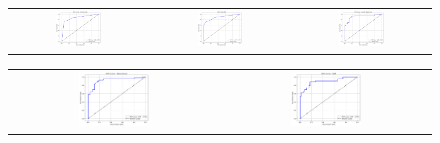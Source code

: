 \documentclass[pt]{article}  %
\begin{document}
\begin{figure}[H]
\begin{center}
\begin{tabular}{c c c} %
    \includegraphics[width=0.35\textwidth]{roc-curve/decision-tree.png} & %
    \includegraphics[width=0.35\textwidth]{roc-curve/knn.png} &
    \includegraphics[width=0.35\textwidth]{roc-curve/logistic.png} \\
\end{tabular}

\vspace{5pt} %

\begin{tabular}{c c} %
    \includegraphics[width=0.35\textwidth]{roc-curve/nb.png} &
    \includegraphics[width=0.35\textwidth]{roc-curve/svm.png} \\
\end{tabular}


\end{center}
\end{figure}
\end{document}
